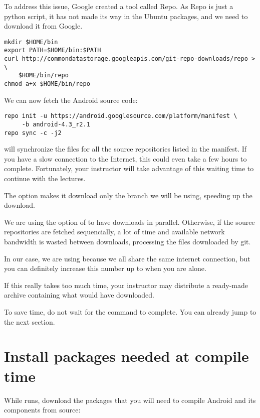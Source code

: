 To address this issue, Google created a tool called Repo. As Repo is
just a python script, it has not made its way in the Ubuntu packages,
and we need to download it from Google.

\begin{verbatim}
mkdir $HOME/bin
export PATH=$HOME/bin:$PATH
curl http://commondatastorage.googleapis.com/git-repo-downloads/repo > \
    $HOME/bin/repo
chmod a+x $HOME/bin/repo
\end{verbatim}

We can now fetch the Android source code:

\begin{verbatim}
repo init -u https://android.googlesource.com/platform/manifest \
     -b android-4.3_r2.1
repo sync -c -j2
\end{verbatim}

 will synchronize the files for all the source
repositories listed in the manifest. If you have a slow connection to
the Internet, this could even take a few hours to
complete. Fortunately, your instructor will take advantage of this
waiting time to continue with the lectures.

The  option makes it download only the branch we will be
using, speeding up the download.

We are using the  option of  to have 
downloads in parallel. Otherwise, if the source repositories are fetched
sequencially, a lot of time and available network bandwidth is wasted
between downloads, processing the files downloaded by git.

In our case, we are using  because we all share the same
internet connection, but you can definitely increase this number up to
\code{8} when you are alone.

If this really takes too much time, your instructor may distribute a
ready-made archive containing what  would have
downloaded.

To save time, do not wait for the  command to
complete. You can already jump to the next section.

\section{Install packages needed at compile time}

While  runs, download the packages that you will need
to compile Android and its components from source:

